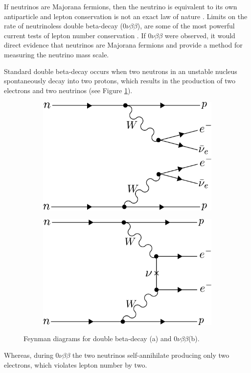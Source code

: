If neutrinos are Majorana fermions, then the neutrino is equivalent to its own antiparticle and lepton conservation is not an exact law of nature \cite{double_beta1}. Limits on the rate of neutrinoless double beta-decay ($0\nu\beta\beta$), are some of the most powerful current tests of lepton number conservation \cite{Workman:2022ynf}. If $0\nu\beta\beta$ were observed, it would direct evidence that neutrinos are Majorana fermions and provide a method for measuring the neutrino mass scale.

Standard double beta-decay occurs when two neutrons in an unstable nucleus spontaneously decay into two protons, which results in the production of two electrons and two neutrinos (see Figure \ref{fig:chap2-0nubetabeta-diagram}).  
\begin{figure}[htbp]
    \centering
    \begin{subfigure}{0.4\textwidth}
        \includegraphics*[width=\textwidth]{figs/Chapter-2/230717_2nubetabeta.png}
        \caption{}
    \end{subfigure}
    \begin{subfigure}{0.4\textwidth}
        \includegraphics*[width=\textwidth]{figs/Chapter-2/230717_0nubetabeta.png}
        \caption{}
    \end{subfigure}
    \caption{\label{fig:chap2-0nubetabeta-diagram} Feynman diagrams for double beta-decay (a) and $0\nu\beta\beta$(b).}
\end{figure}
Whereas, during $0\nu\beta\beta$ the two neutrinos self-annihilate producing only two electrons, which violates lepton number by two. 

